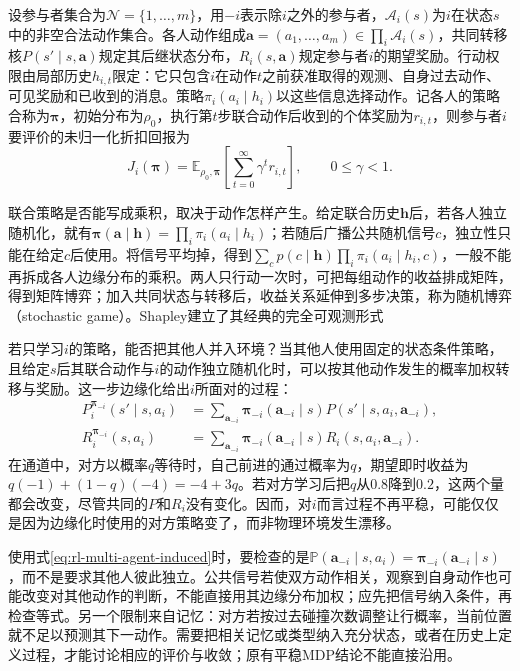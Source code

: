 \begin{definition}[多参与者序贯决策]
\label{def:rl-multi-agent-game}
设参与者集合为$\mathcal N=\{1,\ldots,m\}$，用$-i$表示除$i$之外的参与者，$\mathcal A_i(s)$为$i$在状态$s$中的非空合法动作集合。各人动作组成$\bm a=(a_1,\ldots,a_m)\in\prod_i\mathcal A_i(s)$，共同转移核$P(s'\mid s,\bm a)$规定其后继状态分布，$R_i(s,\bm a)$规定参与者$i$的期望奖励。行动权限由局部历史$h_{i,t}$限定：它只包含$i$在动作$t$之前获准取得的观测、自身过去动作、可见奖励和已收到的消息。策略$\pi_i(a_i\mid h_i)$以这些信息选择动作。记各人的策略合称为$\bm\pi$，初始分布为$\rho_0$，执行第$t$步联合动作后收到的个体奖励为$r_{i,t}$，则参与者$i$要评价的未归一化折扣回报为
\[
 J_i(\bm\pi)=\mathbb E_{\rho_0,\bm\pi}
 \left[\sum_{t=0}^{\infty}\gamma^t r_{i,t}\right],
 \qquad 0\leq\gamma<1.
\]
\end{definition}

联合策略是否能写成乘积，取决于动作怎样产生。给定联合历史$\bm h$后，若各人独立随机化，就有$\bm\pi(\bm a\mid\bm h)=\prod_i\pi_i(a_i\mid h_i)$；若随后广播公共随机信号$c$，独立性只能在给定$c$后使用。将信号平均掉，得到$\sum_c p(c\mid\bm h)\prod_i\pi_i(a_i\mid h_i,c)$，一般不能再拆成各人边缘分布的乘积。两人只行动一次时，可把每组动作的收益排成矩阵，得到矩阵博弈；加入共同状态与转移后，收益关系延伸到多步决策，称为随机博弈（stochastic game）。Shapley建立了其经典的完全可观测形式

若只学习$i$的策略，能否把其他人并入环境？当其他人使用固定的状态条件策略，且给定$s$后其联合动作与$i$的动作独立随机化时，可以按其他动作发生的概率加权转移与奖励。这一步边缘化给出$i$所面对的过程：
\begin{align}
 P_i^{\bm\pi_{-i}}(s'\mid s,a_i)
 &=\sum_{\bm a_{-i}}\bm\pi_{-i}(\bm a_{-i}\mid s)
 P(s'\mid s,a_i,\bm a_{-i}),\label{eq:rl-multi-agent-induced}\\
 R_i^{\bm\pi_{-i}}(s,a_i)
 &=\sum_{\bm a_{-i}}\bm\pi_{-i}(\bm a_{-i}\mid s)
 R_i(s,a_i,\bm a_{-i}).\nonumber
\end{align}
在通道中，对方以概率$q$等待时，自己前进的通过概率为$q$，期望即时收益为$q(-1)+(1-q)(-4)=-4+3q$。若对方学习后把$q$从$0.8$降到$0.2$，这两个量都会改变，尽管共同的$P$和$R_i$没有变化。因而，对$i$而言过程不再平稳，可能仅仅是因为边缘化时使用的对方策略变了，而非物理环境发生漂移。

使用式\eqref{eq:rl-multi-agent-induced}时，要检查的是$\mathbb P(\bm a_{-i}\mid s,a_i)=\bm\pi_{-i}(\bm a_{-i}\mid s)$，而不是要求其他人彼此独立。公共信号若使双方动作相关，观察到自身动作也可能改变对其他动作的判断，不能直接用其边缘分布加权；应先把信号纳入条件，再检查等式。另一个限制来自记忆：对方若按过去碰撞次数调整让行概率，当前位置就不足以预测其下一动作。需要把相关记忆或类型纳入充分状态，或者在历史上定义过程，才能讨论相应的评价与收敛；原有平稳MDP结论不能直接沿用。

